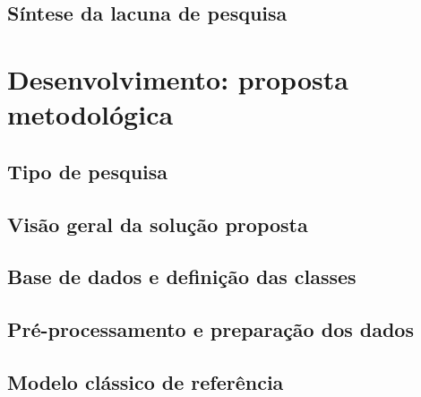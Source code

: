 \documentclass[
    12pt,
    openright,
    oneside,
    a4paper,
    english,
    brazil
]{abntex2}
\begin{document}
\section{Síntese da lacuna de pesquisa}



\chapter{Desenvolvimento: proposta metodológica}

\section{Tipo de pesquisa}


\section{Visão geral da solução proposta}


\section{Base de dados e definição das classes}


\section{Pré-processamento e preparação dos dados}


\section{Modelo clássico de referência}
\end{document}
